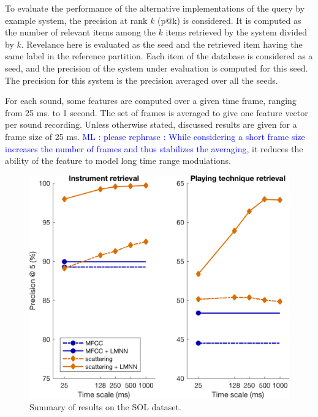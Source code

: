 \documentclass{article}
\newcommand{\ml}[1]{\textcolor{blue}{ML : #1}}
\begin{document}
To evaluate the performance of the alternative implementations of the query by example system, the precision at rank $k$ (p@k) is considered. It is computed as the number of relevant items among the $k$ items retrieved by the system divided by $k$. Revelance here is evaluated as the seed and the retrieved item having the same label in the reference partition. Each item of the database is considered as a seed, and the precision of the system under evaluation is computed for this seed. The precision for this system is the precision averaged over all the seeds.


For each sound, some features are computed over a given time frame, ranging from 25 ms. to 1 second. The set of frames is averaged to give one feature vector per sound recording. Unless otherwise stated, discussed results are given for a frame size of 25 ms. \ml{please rephrase : While considering a short frame size increases the number of frames and thus stabilizes the averaging}, it reduces the ability of the feature to model long time range modulations.

\begin{figure}
\includegraphics[width=\linewidth,keepaspectratio]{./figs/results/results.png}
\caption{Summary of results on the SOL dataset.}
\label{fig:results}
\end{figure}
\end{document}
